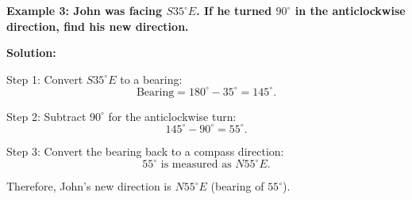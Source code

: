 \begin{flushleft}
	\textbf{Example 3: John was facing $S35^\circ E$. If he turned $90^\circ$ in the anticlockwise direction, find his new direction.}
	
	\vspace{0.5cm}
	\textbf{Solution:}
	\vspace{0.5cm}
	
	Step 1: Convert $S35^\circ E$ to a bearing:
	\[
	\text{Bearing} = 180^\circ - 35^\circ = 145^\circ.
	\]
	
	Step 2: Subtract $90^\circ$ for the anticlockwise turn:
	\[
	145^\circ - 90^\circ = 55^\circ.
	\]
	
	Step 3: Convert the bearing back to a compass direction:
	\[
	55^\circ \text{ is measured as } N55^\circ E.
	\]
	
	Therefore, John's new direction is $N55^\circ E$ (bearing of $55^\circ$).
\end{flushleft}



